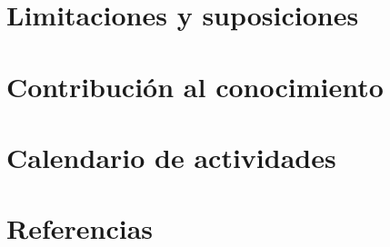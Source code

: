 \documentclass[letterpaper,12pt]{cicese}
\begin{document}
		\chapter{Limitaciones y suposiciones}
		\chapter{Contribuci\'on al conocimiento}
		\chapter{Calendario de actividades}
		\chapter{Referencias}
	
\end{document}
